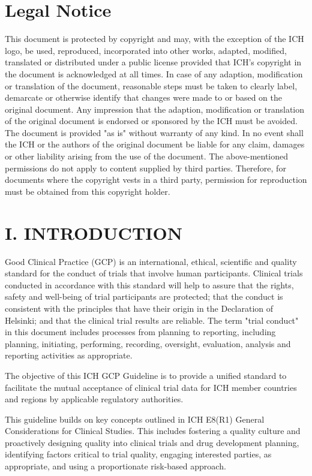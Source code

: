 \documentclass[11pt]{article}
\begin{document}
\section*{Legal Notice}

This document is protected by copyright and may, with the exception of the ICH logo, be used, reproduced, incorporated into other works, adapted, modified, translated or distributed under a public license provided that ICH's copyright in the document is acknowledged at all times. In case of any adaption, modification or translation of the document, reasonable steps must be taken to clearly label, demarcate or otherwise identify that changes were made to or based on the original document. Any impression that the adaption, modification or translation of the original document is endorsed or sponsored by the ICH must be avoided. The document is provided "as is" without warranty of any kind. In no event shall the ICH or the authors of the original document be liable for any claim, damages or other liability arising from the use of the document. The above-mentioned permissions do not apply to content supplied by third parties. Therefore, for documents where the copyright vests in a third party, permission for reproduction must be obtained from this copyright holder.
\clearpage
{}
\section{I. INTRODUCTION}

Good Clinical Practice (GCP) is an international, ethical, scientific and quality standard for the conduct of trials that involve human participants. Clinical trials conducted in accordance with this standard will help to assure that the rights, safety and well-being of trial participants are protected; that the conduct is consistent with the principles that have their origin in the Declaration of Helsinki; and that the clinical trial results are reliable. The term "trial conduct" in this document includes processes from planning to reporting, including planning, initiating, performing, recording, oversight, evaluation, analysis and reporting activities as appropriate.


The objective of this ICH GCP Guideline is to provide a unified standard to facilitate the mutual acceptance of clinical trial data for ICH member countries and regions by applicable regulatory authorities.


This guideline builds on key concepts outlined in ICH E8(R1) General Considerations for Clinical Studies. This includes fostering a quality culture and proactively designing quality into clinical trials and drug development planning, identifying factors critical to trial quality, engaging interested parties, as appropriate, and using a proportionate risk-based approach.
\end{document}
